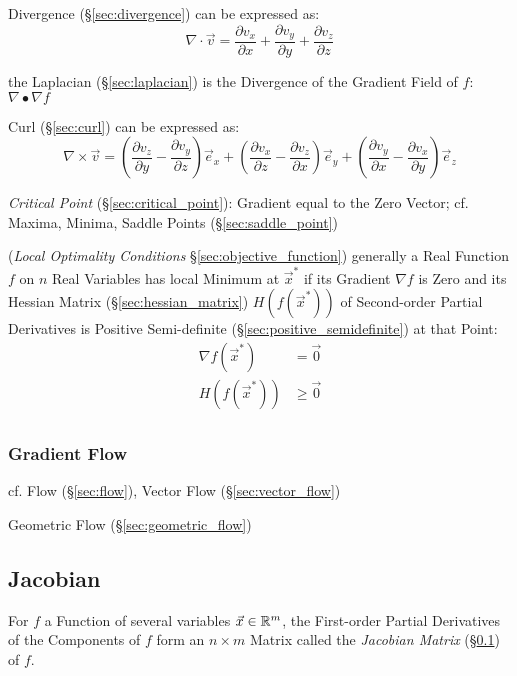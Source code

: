 Divergence (\S\ref{sec:divergence}) can be expressed as:
\[
  \nabla \cdot \vec{v} =
    \frac{\partial v_x}{\partial x} +
    \frac{\partial v_y}{\partial y} +
    \frac{\partial v_z}{\partial z}
\]

the Laplacian (\S\ref{sec:laplacian}) is the Divergence of the Gradient Field
of $f$: $\nabla \bullet \nabla f$

Curl (\S\ref{sec:curl}) can be expressed as:
\[
  \nabla\times\vec{v} =
    (\frac{\partial v_z}{\partial y}-\frac{\partial v_y}{\partial z})\vec{e}_x +
    (\frac{\partial v_x}{\partial z}-\frac{\partial v_z}{\partial x})\vec{e}_y +
    (\frac{\partial v_y}{\partial x}-\frac{\partial v_x}{\partial y})\vec{e}_z
\]

\emph{Critical Point} (\S\ref{sec:critical_point}): Gradient equal to the Zero
Vector; cf. Maxima, Minima, Saddle Points (\S\ref{sec:saddle_point})

(\emph{Local Optimality Conditions} \S\ref{sec:objective_function}) generally a
Real Function $f$ on $n$ Real Variables has local Minimum at $\vec{x}^*$ if its
Gradient $\nabla f$ is Zero and its Hessian Matrix (\S\ref{sec:hessian_matrix})
$H(f(\vec{x}^*))$ of Second-order Partial Derivatives is Positive Semi-definite
(\S\ref{sec:positive_semidefinite}) at that Point:
\begin{align*}
  \nabla f(\vec{x}^*) & =    \vec{0} \\
  H(f(\vec{x}^*))     & \geq \vec{0} \\
\end{align*}



\subsubsection{Gradient Flow}\label{sec:gradient_flow}

cf. Flow (\S\ref{sec:flow}), Vector Flow (\S\ref{sec:vector_flow})

Geometric Flow (\S\ref{sec:geometric_flow})



\subsection{Jacobian}\label{sec:jacobian}

For $f$ a Function of several variables $\vec{x} \in \mathbb{R}^m$, the First-order
Partial Derivatives of the Components of $f$ form an $n \times m$ Matrix called
the \emph{Jacobian Matrix} (\S\ref{sec:jacobian}) of $f$.

